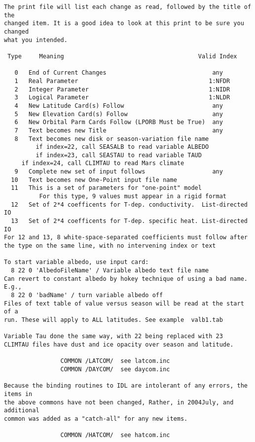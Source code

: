 \begin{verbatim}
The print file will list each change as read, followed by the title of the
changed item. It is a good idea to look at this print to be sure you changed
what you intended.

 Type     Meaning                                      Valid Index

   0   End of Current Changes                              any
   1   Real Parameter                                     1:NFDR
   2   Integer Parameter                                  1:NIDR
   3   Logical Parameter                                  1:NLDR
   4   New Latitude Card(s) Follow                         any
   5   New Elevation Card(s) Follow                        any
   6   New Orbital Parm Cards Follow (LPORB Must be True)  any
   7   Text becomes new Title                              any
   8   Text becomes new disk or season-variation file name
         if index=22, call SEASALB to read variable ALBEDO
         if index=23, call SEASTAU to read variable TAUD
	 if index=24, call CLIMTAU to read Mars climate
   9   Complete new set of input follows                   any
  10   Text becomes new One-Point input file name
  11   This is a set of parameters for "one-point" model 
          For this type, 9 values must appear in a rigid format
  12   Set of 2*4 coefficents for T-dep. conductivity.  List-directed IO
  13   Set of 2*4 coefficents for T-dep. specific heat. List-directed IO 
For 12 and 13, 8 white-space-separated coefficients must follow after 
the type on the same line, with no intervening index or text 

To start variable albedo, use input card: 
  8 22 0 'AlbedoFileName' / Variable albedo text file name
Can revert to constant albedo by hokey technique of using a bad name. E.g.,
  8 22 0 'badName' / turn variable albedo off
Files of text table of value versus season will be read at the start of a
run. These will apply to ALL latitudes. See example  valb1.tab
 
Variable Tau done the same way, with 22 being replaced with 23
CLIMTAU files have dust and ice opacity over season and latitude.

                COMMON /LATCOM/  see latcom.inc
                COMMON /DAYCOM/  see daycom.inc

Because the binding routines to IDL are intolerant of any errors, the items in
the above commons have not been changed, Rather, in 2004July, and additional
common was added as a "catch-all" for any new items.

                COMMON /HATCOM/  see hatcom.inc


\end{verbatim}
